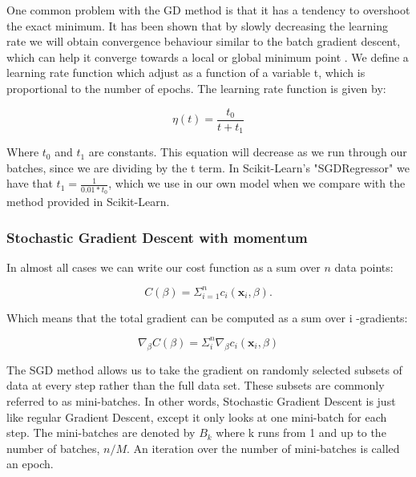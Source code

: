 \documentclass[a4paper, UKenglish, 11pt]{uiomaster}
\begin{document}
One common problem with the GD method is that it has a tendency to overshoot the exact minimum. It has been shown that by slowly decreasing the learning rate we will obtain convergence behaviour similar to the batch gradient descent, which can help it converge towards a local or global minimum point \cite{100}. We define a learning rate function which adjust as a function of a variable t, which is proportional to the number of epochs. The learning rate function is given by:

\begin{equation}
    \eta(t)=\frac{t_0}{t+t_1}
\label{eq:learning_rate_func}
\end{equation}

Where $t_0$ and $t_1$ are constants. This equation will decrease as we run through our batches, since we are dividing by the t term. In Scikit-Learn's "SGDRegressor" we have that $t_1=\frac{1}{0.01*t_0}$, which we use in our own model when we compare with the method provided in Scikit-Learn.


\subsubsection*{Stochastic Gradient Descent with momentum}

In almost all cases we can write our cost function as a sum over $n$ data points:

\begin{equation}
    C(\beta) = \Sigma^{n}_{i=1}c_i(\textbf{x}_i, \beta).
\end{equation}

Which means that the total gradient can be computed as a sum over i -gradients:

\begin{equation}
    \nabla_\beta C(\beta) = \Sigma^n_i\nabla_\beta c_i(\textbf{x}_i, \beta)
    \label{eq:SGD}
\end{equation}


The SGD method allows us to take the gradient on randomly selected subsets of data at every step rather than the full data set. These subsets are commonly referred to as mini-batches. In other words, Stochastic Gradient Descent is just like regular Gradient Descent, except it only looks at one mini-batch for each step. The mini-batches are denoted by $B_k$ where k runs from 1 and up to the number of batches, $n/M$. An iteration over the number of mini-batches is called an epoch.
\end{document}
